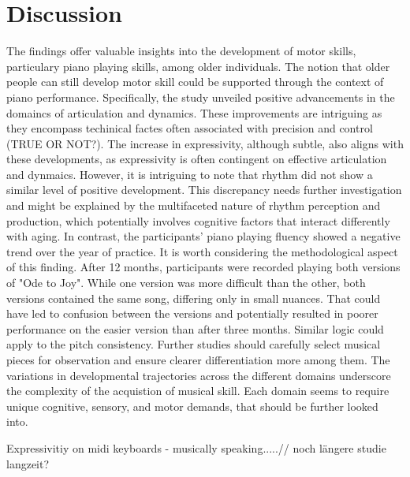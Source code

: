 \chapter{Discussion}
\label{cha:Discussion}


The findings offer valuable insights into the development of motor skills,  particulary piano playing skills, among older individuals. The notion that older people can still develop motor skill could be supported through the context of piano performance. 
Specifically, the study unveiled positive advancements in the domaincs of articulation and dynamics. These improvements are intriguing as they encompass techinical factes often associated with precision and control (TRUE OR NOT?). The increase in expressivity, although subtle, also aligns with these developments, as expressivity is often contingent on effective articulation and dynmaics. However, it is intriguing to note that rhythm did not show a similar level of positive development. This discrepancy needs further investigation and might be explained by the multifaceted nature of rhythm perception and production, which potentially involves cognitive factors that interact differently with aging.
In contrast, the participants' piano playing fluency showed a negative trend over the year of practice. It is worth considering the methodological aspect of this finding. After 12 months, participants were recorded playing both versions of "Ode to Joy". While one version was more difficult than the other, both versions contained the same song, differing only in small nuances. That could have led to confusion between the versions and potentially resulted in poorer performance on the easier version than after three months. Similar logic could apply to the pitch consistency. Further studies should carefully select musical pieces for observation and ensure clearer differentiation more among them. 
The variations in developmental trajectories across the different domains underscore the complexity of the acquistion of musical skill. Each domain seems to require unique cognitive, sensory, and motor demands, that should be further looked into.



Expressivitiy on midi keyboards - musically speaking.....//
noch längere studie
langzeit?



